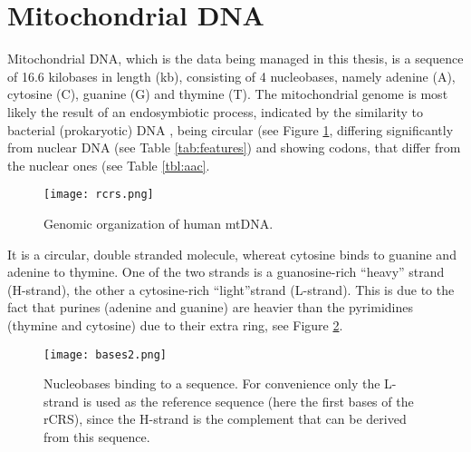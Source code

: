 \section{Mitochondrial DNA}
Mitochondrial DNA, which is the data being managed in this thesis, is a sequence of 16.6 kilobases in length (kb), consisting of 4 nucleobases, namely adenine (A), cytosine (C), guanine (G) and thymine (T). The mitochondrial genome is most likely the result of an endosymbiotic process, indicated by the similarity to bacterial (prokaryotic) DNA \cite{Pittis2016}, being circular (see Figure \ref{fig:rcrs}, differing significantly from nuclear DNA (see Table \ref{tab:features}) and showing codons, that differ from the nuclear ones (see Table \ref{tbl:aac}. 
\begin{figure}[ht]
\begin{center}
\texttt{[image: rcrs.png]}
\caption[Genomic organization of human mtDNA]{Genomic organization of human mtDNA. }
\label{fig:rcrs}
\end{center}
\end{figure}
It is a circular, double stranded molecule, whereat cytosine binds to guanine and adenine to thymine. One of the two strands is a guanosine-rich "`heavy"' strand (H-strand), the other a cytosine-rich "`light"'strand (L-strand). This is due to the fact that purines (adenine and guanine) are heavier than the pyrimidines (thymine and cytosine) due to their extra ring, see Figure \ref{fig:figureBases}.
\begin{figure}[ht]
\begin{center}
\texttt{[image: bases2.png]}
\caption[Nucleobases binding to a sequence]{Nucleobases binding to a sequence. For convenience only the L-strand is used as the reference sequence (here the first bases of the rCRS), since the H-strand is the complement that can be derived from this sequence.}
\label{fig:figureBases}
\end{center}
\end{figure}

